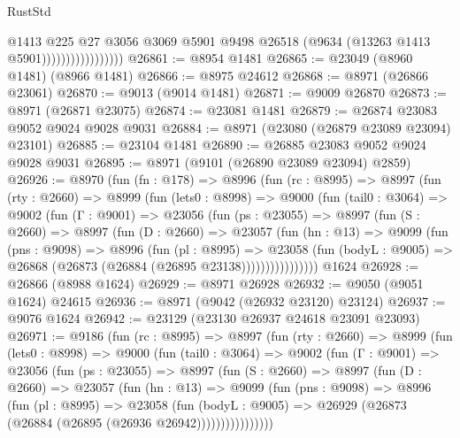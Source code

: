 \begin{lexlean}{RustStd}
\begin{coremodule}
                                  @1413
                                  @225
                                  @27
                                  @3056
                                  @3069
                                  @5901
                                  @9498
                                  @26518
                                  (@9634 (@13263 @1413 @5901)))))))))))))))))
@26861 := @8954 @1481
@26865 := @23049 (@8960 @1481) (@8966 @1481)
@26866 := @8975 @24612
@26868 := @8971 (@26866 @23061)
@26870 := @9013 (@9014 @1481)
@26871 := @9009 @26870
@26873 := @8971 (@26871 @23075)
@26874 := @23081 @1481
@26879 := @26874 @23083 @9052 @9024 @9028 @9031
@26884 := @8971 (@23080 (@26879 @23089 @23094) @23101)
@26885 := @23104 @1481
@26890 := @26885 @23083 @9052 @9024 @9028 @9031
@26895 := @8971 (@9101 (@26890 @23089 @23094) @2859)
@26926 := @8970
    (fun (fn : @178) =>
    @8996
      (fun (rc : @8995) =>
      @8997
        (fun (rty : @2660) =>
        @8999
          (fun (lets0 : @8998) =>
          @9000
            (fun (tail0 : @3064) =>
            @9002
              (fun (Γ : @9001) =>
              @23056
                (fun (ps : @23055) =>
                @8997
                  (fun (S : @2660) =>
                  @8997
                    (fun (D : @2660) =>
                    @23057
                      (fun (hn : @13) =>
                      @9099
                        (fun (pns : @9098) =>
                        @8996
                          (fun (pl : @8995) =>
                          @23058
                            (fun (bodyL : @9005) =>
                            @26868 (@26873 (@26884 (@26895 @23138))))))))))))))))
    @1624
@26928 := @26866 (@8988 @1624)
@26929 := @8971 @26928
@26932 := @9050 (@9051 @1624) @24615
@26936 := @8971 (@9042 (@26932 @23120) @23124)
@26937 := @9076 @1624
@26942 := @23129 (@23130 @26937 @24618 @23091 @23093)
@26971 := @9186
    (fun (rc : @8995) =>
    @8997
      (fun (rty : @2660) =>
      @8999
        (fun (lets0 : @8998) =>
        @9000
          (fun (tail0 : @3064) =>
          @9002
            (fun (Γ : @9001) =>
            @23056
              (fun (ps : @23055) =>
              @8997
                (fun (S : @2660) =>
                @8997
                  (fun (D : @2660) =>
                  @23057
                    (fun (hn : @13) =>
                    @9099
                      (fun (pns : @9098) =>
                      @8996
                        (fun (pl : @8995) =>
                        @23058
                          (fun (bodyL : @9005) =>
                          @26929 (@26873 (@26884 (@26895 (@26936 @26942))))))))))))))))

\end{coremodule}
\end{lexlean}
